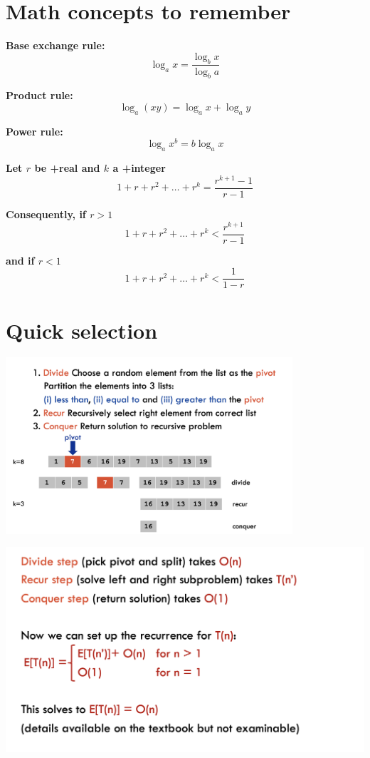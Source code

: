 \documentclass[12pt]{article}
\newcommand{\1}{\space \quad}
\newcommand{\2}{\quad \quad \quad}
\newcommand{\3}{\quad \quad \quad \quad \space}
\newcommand{\4}{\quad \quad \quad \quad \quad \quad}
\newcommand{\5}{\quad \quad \quad \quad \quad \quad \quad \space}
\begin{document}
\section{Math concepts to remember}

\textbf{Base exchange rule:}
\[
\log_a x = \frac{\log_b x}{\log_b a}
\]

\textbf{Product rule:}
\[
\log_a (xy) = \log_a x + \log_a y
\]

\textbf{Power rule:}
\[
\log_a x^b = b \log_a x
\]

\textbf{Let $r$ be +real and $k$ a +integer}
\[
1 + r + r^2 + \ldots + r^k = \frac{{r^{k+1} - 1}}{{r - 1}}
\]

\textbf{Consequently, if $r > 1$}
\[
1 + r + r^2 + \ldots + r^k < \frac{{r^{k+1}}}{{r - 1}}
\]

\textbf{and if $r < 1$}
\[
1 + r + r^2 + \ldots + r^k < \frac{1}{{1 - r}}
\]

\section{Quick selection}
\begin{center}
  \includegraphics*[width=0.8\textwidth]{image43.png}
\end{center}
\begin{center}
  \includegraphics*[width=\textwidth]{image44.png}
\end{center}
\end{document}
